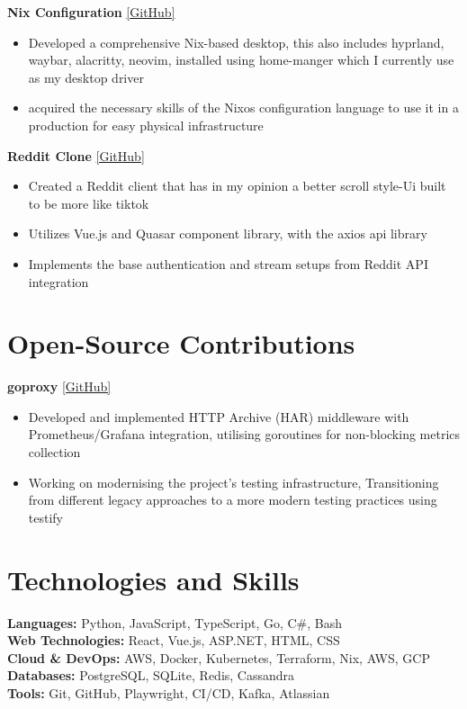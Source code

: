 \documentclass[10pt,a4paper]{article}
\begin{document}
	\textbf{Nix Configuration} \href{https://github.com/CameronBadman/nvim-config}{[GitHub]}
	\begin{itemize}[label=\textbullet, itemsep=0.05cm]
		\item Developed a comprehensive Nix-based desktop, this also includes hyprland, waybar, alacritty, neovim, installed using home-manger which I currently use as my desktop driver
		\item acquired the necessary skills of the Nixos configuration language to use it in a production for easy physical infrastructure
	\end{itemize}
	
	\textbf{Reddit Clone} \href{https://github.com/CameronBadman/Reddit-Clone}{[GitHub]}
	\begin{itemize}[label=\textbullet, itemsep=0.05cm]
		\item Created a Reddit client that has in my opinion a better scroll style-Ui built to be more like tiktok 
		\item Utilizes Vue.js and Quasar component library, with the axios api library
		\item Implements the base authentication and stream setups from Reddit API integration
	\end{itemize}
	
	
	\section{Open-Source Contributions}
	\textbf{goproxy} \href{https://github.com/elazarl/goproxy}{[GitHub]}
	\begin{itemize}[label=\textbullet, itemsep=0.05cm]
		\item Developed and implemented HTTP Archive (HAR) middleware with Prometheus/Grafana integration, utilising goroutines for non-blocking metrics collection
		\item Working on modernising the project's testing infrastructure, Transitioning from different legacy approaches to a more modern testing practices using testify
	\end{itemize}
	
	\section{Technologies and Skills}
	\textbf{Languages:} Python, JavaScript, TypeScript, Go, C\#, Bash \\
	\hspace*{0.5cm}\textbf{Web Technologies:} React, Vue.js, ASP.NET, HTML, CSS \\
	\hspace*{0.5cm}\textbf{Cloud \& DevOps:} AWS, Docker, Kubernetes, Terraform, Nix, AWS, GCP \\
	\hspace*{0.5cm}\textbf{Databases:} PostgreSQL, SQLite, Redis, Cassandra \\
	\hspace*{0.5cm}\textbf{Tools:} Git, GitHub, Playwright, CI/CD, Kafka, Atlassian
	
\end{document}
